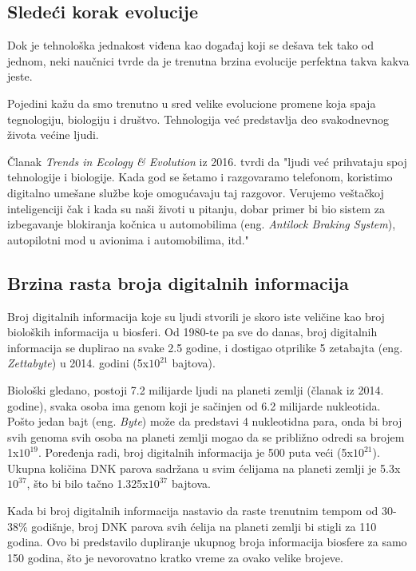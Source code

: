 \documentclass[a4paper]{article}
\begin{document}
\subsection{Sledeći korak evolucije}
\label{subsec:sledeći_korak_evolucije}
\hfill

Dok je tehnološka jednakost viđena kao događaj koji se dešava tek tako od jednom, neki naučnici tvrde da je trenutna brzina evolucije perfektna takva kakva jeste.

Pojedini kažu da smo trenutno u sred velike evolucione promene koja spaja tegnologiju, biologiju i društvo. Tehnologija već predstavlja deo svakodnevnog života većine ljudi.

Članak \textit{Trends in Ecology \& Evolution}\cite{r3} iz 2016. tvrdi da "ljudi već prihvataju spoj tehnologije i biologije. Kada god se šetamo i razgovaramo telefonom, koristimo digitalno umešane službe koje omogućavaju taj razgovor. Verujemo veštačkoj inteligenciji čak i kada su naši životi u pitanju, dobar primer bi bio sistem za izbegavanje blokiranja kočnica u automobilima (eng. \textit{Antilock Braking System}), autopilotni mod u avionima i automobilima, itd."

\subsection{Brzina rasta broja digitalnih informacija}
\label{subsec:broj_digitalnih_informacija_}

\hfill

Broj digitalnih informacija koje su ljudi stvorili je skoro iste veličine kao broj bioloških informacija u biosferi. Od 1980-te pa sve do danas, broj digitalnih informacija se duplirao na svake 2.5 godine, i dostigao otprilike 5 zetabajta (eng. \textit{Zettabyte}) u 2014. godini (5x$10^{21}$ bajtova).\cite{r4}

Biološki gledano, postoji 7.2 milijarde ljudi na planeti zemlji (članak iz 2014. godine), svaka osoba ima genom koji je sačinjen od 6.2 milijarde nukleotida. Pošto jedan bajt (eng. \textit{Byte}) može da predstavi 4 nukleotidna para, onda bi broj svih genoma svih osoba na planeti zemlji mogao da se približno odredi sa brojem 1x$10^{19}$. Poređenja radi, broj digitalnih informacija je 500 puta veći (5x$10^{21}$). Ukupna količina DNK parova sadržana u svim ćelijama na planeti zemlji je 5.3x$10^{37}$, što bi bilo tačno 1.325x$10^{37}$ bajtova.

Kada bi broj digitalnih informacija nastavio da raste trenutnim tempom od 30-38\% godišnje\cite{r5}, broj DNK parova svih ćelija na planeti zemlji bi stigli za 110 godina. Ovo bi predstavilo dupliranje ukupnog broja informacija biosfere za samo 150 godina, što je nevorovatno kratko vreme za ovako velike brojeve.\cite{r6}
\end{document}
